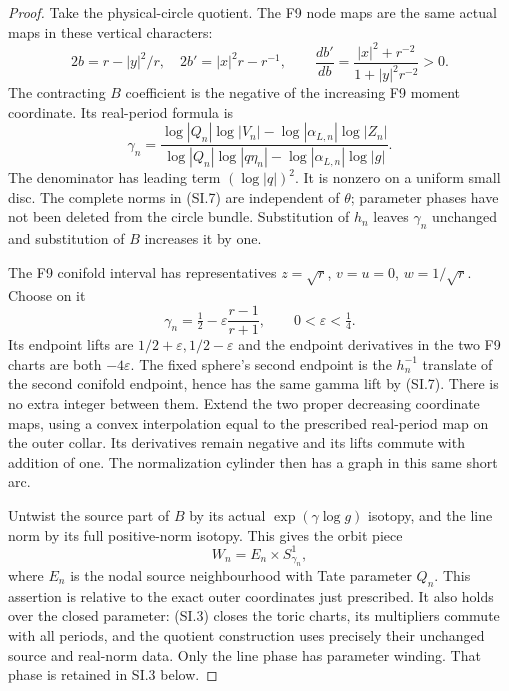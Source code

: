 \begin{proof}
Take the physical-circle quotient. The F9 node maps are the same
actual maps in these vertical characters:
\[
 2b=r-|y|^2/r,\quad 2b'=|x|^2r-r^{-1},\qquad
 \frac{db'}{db}=\frac{|x|^2+r^{-2}}{1+|y|^2r^{-2}}>0.
                                                        \tag{SI.6}
\]
The contracting \(B\) coefficient is the negative of the increasing
F9 moment coordinate. Its real-period formula is
\[
 \gamma_n=
 \frac{\log|Q_n|\log|V_n|-\log|\alpha_{L,n}|\log|Z_n|}
 {\log|Q_n|\log|q\eta_n|-\log|\alpha_{L,n}|\log|g|}.
                                                        \tag{SI.7}
\]
The denominator has leading term \((\log|q|)^2\). It is nonzero on a
uniform small disc. The complete norms in (SI.7) are independent of
\(\theta\); parameter phases have not been deleted from the circle
bundle. Substitution of \(h_n\) leaves \(\gamma_n\) unchanged and
substitution of \(B\) increases it by one.

The F9 conifold interval has representatives \(z=\sqrt r\), \(v=u=0\),
\(w=1/\sqrt r\). Choose on it
\[
 \gamma_n=\tfrac12-\varepsilon\frac{r-1}{r+1},
 \qquad0<\varepsilon<\tfrac14.                       \tag{SI.8}
\]
Its endpoint lifts are \(1/2+\varepsilon,1/2-\varepsilon\) and the
endpoint derivatives in the two F9 charts are both \(-4\varepsilon\).
The fixed sphere's second endpoint is the \(h_n^{-1}\) translate of the
second conifold endpoint, hence has the same gamma lift by (SI.7).
There is no extra integer between them. Extend the two proper
decreasing coordinate maps, using a convex interpolation equal to
the prescribed real-period map on the outer collar. Its derivatives
remain negative and its lifts commute with addition of one. The
normalization cylinder then has a graph in this same short arc.

Untwist the source part of \(B\) by its actual \(\exp(\gamma\log g)\)
isotopy, and the line norm by its full positive-norm isotopy. This
gives the orbit piece
\[
 W_n=E_n\times S^1_{\gamma_n},
                                                        \tag{SI.9}
\]
where \(E_n\) is the nodal source neighbourhood with Tate parameter
\(Q_n\). This assertion is relative to the exact outer coordinates
just prescribed. It also holds over the closed parameter: (SI.3)
closes the toric charts, its multipliers commute with all periods,
and the quotient construction uses precisely their unchanged
source and real-norm data. Only the line phase has parameter
winding. That phase is retained in SI.3 below.

\par


\end{proof}
